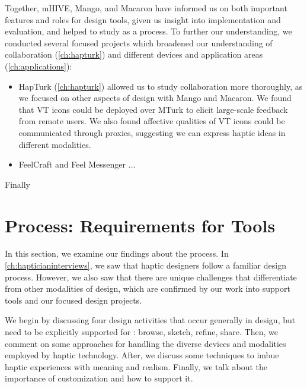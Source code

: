 Together, mHIVE, Mango, and Macaron have informed us on both important features and roles for design tools, given us insight into implementation and evaluation, and helped to study \haxd as a process.
To further our understanding, we conducted several focused projects which broadened our understanding of collaboration (\autoref{ch:hapturk}) and different devices and application areas (\autoref{ch:applications}):

\begin{itemize}
	\item HapTurk (\autoref{ch:hapturk}) allowed us to study collaboration more thoroughly, as we focused on other aspects of design with Mango and Macaron. We found that VT icons could be deployed over MTurk to elicit large-scale feedback from remote users. We also found affective qualities of VT icons could be communicated through proxies, suggesting we can express haptic ideas in different modalities.
	\item FeelCraft and Feel Messenger ...
\end{itemize}

Finally 


%
%
\section{\haxd Process: Requirements for Tools}
In this section, we examine our findings about the \haxd process. %
In \autoref{ch:hapticianinterviews}, we saw that haptic designers follow a familiar design process.
However, we also saw that there are unique challenges that differentiate \haxd from other modalities of design, which are confirmed by our work into \haxd support tools and our focused design projects.

We begin by discussing four design activities that occur generally in design, but need to be explicitly supported for \haxd: browse, sketch, refine, share.
Then, we comment on some approaches for handling the diverse devices and modalities employed by haptic technology.
After, we discuss some techniques to imbue haptic experiences with meaning and realism.
Finally, we talk about the importance of customization and how to support it.

